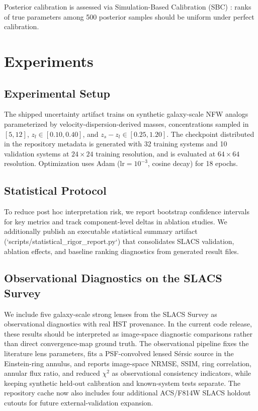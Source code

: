 \documentclass[journal]{IEEEtran}
\begin{document}
Posterior calibration is assessed via Simulation-Based Calibration (SBC)
\citep{Talts2018}: ranks of true parameters among 500 posterior samples
should be uniform under perfect calibration.

\section{Experiments}
\label{sec:experiments}

\subsection{Experimental Setup}
The shipped uncertainty artifact trains on synthetic galaxy-scale NFW analogs
parameterized by velocity-dispersion-derived masses, concentrations sampled in
$[5, 12]$, $z_l \in [0.10, 0.40]$, and $z_s - z_l \in [0.25, 1.20]$. The
checkpoint distributed in the repository metadata is generated with 32 training
systems and 10 validation systems at $24{\times}24$ training resolution, and
is evaluated at $64{\times}64$ resolution. Optimization uses Adam
($\text{lr}=10^{-3}$, cosine decay) for 18 epochs.

\subsection{Statistical Protocol}
\label{subsec:statistical_protocol}
To reduce post hoc interpretation risk, we report bootstrap confidence
intervals for key metrics and track component-level deltas in ablation studies.
We additionally publish an executable statistical summary artifact
(`scripts/statistical_rigor_report.py`) that consolidates SLACS validation,
ablation effects, and baseline ranking diagnostics from generated result files.

\subsection{Observational Diagnostics on the SLACS Survey}
We include five galaxy-scale strong lenses from the SLACS Survey
\citep{Bolton2008,Auger2010,Treu2006} as observational diagnostics with real
HST provenance. In the current code release, these results should be
interpreted as image-space diagnostic comparisons rather than direct
convergence-map ground truth. The observational pipeline fixes the literature
lens parameters, fits a PSF-convolved lensed S\'ersic source in the Einstein-ring
annulus, and reports image-space NRMSE, SSIM, ring correlation, annular flux
ratio, and reduced $\chi^2$ as observational consistency indicators, while
keeping synthetic held-out calibration and known-system tests separate. The
repository cache now also includes four additional ACS/F814W SLACS holdout
cutouts for future external-validation expansion.
\end{document}
